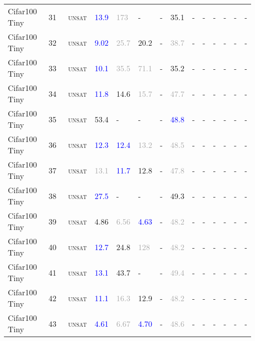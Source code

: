 \begin{center}
{\begin{longtable}{@{}llllllllllllll@{}}
Cifar100 Tiny & 31 & ~\textsc{unsat} & \textcolor{blue}{13.9} & \textcolor{darkgray}{173} & - & - & \textcolor{second}{35.1} & - & - & - & - & - & - \\
Cifar100 Tiny & 32 & ~\textsc{unsat} & \textcolor{blue}{9.02} & \textcolor{darkgray}{25.7} & \textcolor{second}{20.2} & - & \textcolor{darkgray}{38.7} & - & - & - & - & - & - \\
Cifar100 Tiny & 33 & ~\textsc{unsat} & \textcolor{blue}{10.1} & \textcolor{darkgray}{35.5} & \textcolor{darkgray}{71.1} & - & \textcolor{second}{35.2} & - & - & - & - & - & - \\
Cifar100 Tiny & 34 & ~\textsc{unsat} & \textcolor{blue}{11.8} & \textcolor{second}{14.6} & \textcolor{darkgray}{15.7} & - & \textcolor{darkgray}{47.7} & - & - & - & - & - & - \\
Cifar100 Tiny & 35 & ~\textsc{unsat} & \textcolor{second}{53.4} & - & - & - & \textcolor{blue}{48.8} & - & - & - & - & - & - \\
Cifar100 Tiny & 36 & ~\textsc{unsat} & \textcolor{blue}{12.3} & \textcolor{blue}{12.4} & \textcolor{darkgray}{13.2} & - & \textcolor{darkgray}{48.5} & - & - & - & - & - & - \\
Cifar100 Tiny & 37 & ~\textsc{unsat} & \textcolor{darkgray}{13.1} & \textcolor{blue}{11.7} & \textcolor{second}{12.8} & - & \textcolor{darkgray}{47.8} & - & - & - & - & - & - \\
Cifar100 Tiny & 38 & ~\textsc{unsat} & \textcolor{blue}{27.5} & - & - & - & \textcolor{second}{49.3} & - & - & - & - & - & - \\
Cifar100 Tiny & 39 & ~\textsc{unsat} & \textcolor{second}{4.86} & \textcolor{darkgray}{6.56} & \textcolor{blue}{4.63} & - & \textcolor{darkgray}{48.2} & - & - & - & - & - & - \\
Cifar100 Tiny & 40 & ~\textsc{unsat} & \textcolor{blue}{12.7} & \textcolor{second}{24.8} & \textcolor{darkgray}{128} & - & \textcolor{darkgray}{48.2} & - & - & - & - & - & - \\
Cifar100 Tiny & 41 & ~\textsc{unsat} & \textcolor{blue}{13.1} & \textcolor{second}{43.7} & - & - & \textcolor{darkgray}{49.4} & - & - & - & - & - & - \\
Cifar100 Tiny & 42 & ~\textsc{unsat} & \textcolor{blue}{11.1} & \textcolor{darkgray}{16.3} & \textcolor{second}{12.9} & - & \textcolor{darkgray}{48.2} & - & - & - & - & - & - \\
Cifar100 Tiny & 43 & ~\textsc{unsat} & \textcolor{blue}{4.61} & \textcolor{darkgray}{6.67} & \textcolor{blue}{4.70} & - & \textcolor{darkgray}{48.6} & - & - & - & - & - & - \\

\end{longtable}}
\end{center}
